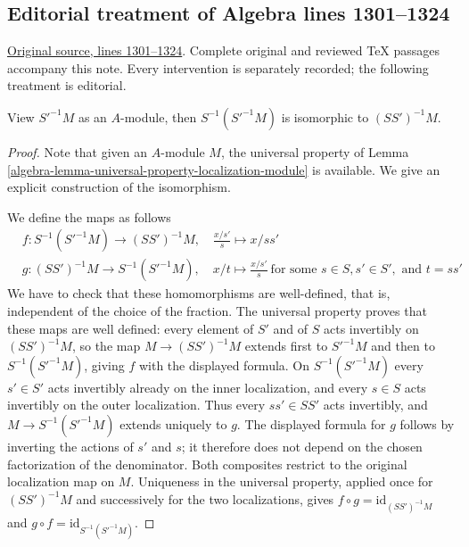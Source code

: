 \subsection{Editorial treatment of Algebra lines 1301--1324}

\hypertarget{algebra-context-002}{}

\noindent\href{https://github.com/stacks/stacks-project/blob/a04446e57ec1fbc252a871afcec7752fb2807b14/algebra.tex\#L1301}{Original source, lines 1301--1324}. Complete original and reviewed TeX passages accompany this note. Every intervention is separately recorded; the following treatment is editorial.


\begin{proposition}
\label{editorial-source-proposition-localize-twice-module}
View $S'^{-1}M$ as an $A$-module, then $S^{-1}(S'^{-1}M)$ is
isomorphic to $(SS')^{-1}M$.
\end{proposition}

\begin{proof}
Note that given an $A$-module $M$, the universal property of
Lemma \ref{algebra-lemma-universal-property-localization-module} is available.
We give an explicit construction of the isomorphism.

\medskip\noindent
We define the maps as follows
\begin{align*}
& f : S^{-1}(S'^{-1}M) \longrightarrow (SS')^{-1}M, \quad \frac{x/s'}{s}\mapsto
x/ss'\\
& g : (SS')^{-1}M \longrightarrow S^{-1}(S'^{-1}M), \quad x/t\mapsto
\frac{x/s'}{s}\ \text{for some }s\in S, s'\in S', \text{ and }
t = ss'
\end{align*}
We have to check that these homomorphisms are well-defined, that is,
independent of the choice of the fraction. The universal property proves that these maps are well defined:
every element of $S'$ and of $S$ acts invertibly on $(SS')^{-1}M$,
so the map $M \to (SS')^{-1}M$ extends first to $S'^{-1}M$
and then to $S^{-1}(S'^{-1}M)$, giving $f$ with the displayed formula.
On $S^{-1}(S'^{-1}M)$ every $s' \in S'$ acts invertibly already
on the inner localization, and every $s \in S$ acts invertibly
on the outer localization. Thus every $ss' \in SS'$ acts invertibly,
and $M \to S^{-1}(S'^{-1}M)$ extends uniquely to $g$.
The displayed formula for $g$ follows by inverting the actions of
$s'$ and $s$; it therefore does not depend on the chosen factorization
of the denominator. Both composites restrict to the original
localization map on $M$. Uniqueness in the universal property,
applied once for $(SS')^{-1}M$ and successively for the two
localizations, gives $f \circ g = \mathrm{id}_{(SS')^{-1}M}$ and
$g \circ f = \mathrm{id}_{S^{-1}(S'^{-1}M)}$.
\end{proof}


